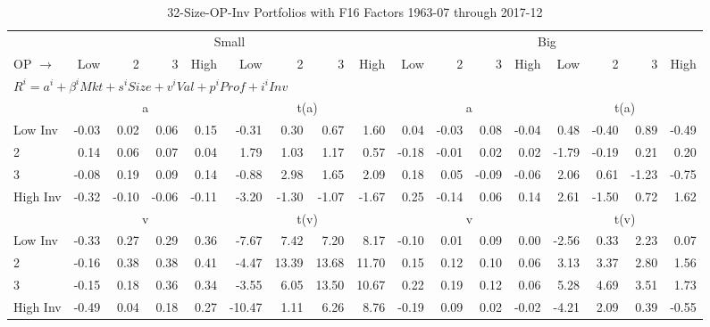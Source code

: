 
\begin{table}[!ht]
\footnotesize
\centering
\caption{32-Size-OP-Inv Portfolios with F16 Factors 1963-07 through 2017-12}
\begin{tabular}{lrrrrrrrrrrrrrrrr}
  \toprule
    & \multicolumn{8}{c}{Small} & \multicolumn{8}{c}{Big} \\
      \cmidrule(r){2-9} \cmidrule(r){10-17}
    OP $\rightarrow$ & Low & 2 & 3 & High & Low & 2 & 3 & High & Low & 2 & 3 & High & Low & 2 & 3 & High \\ 
  \midrule
  \multicolumn{17}{l}{$R^i=a^i+\beta^iMkt+s^iSize+v^iVal+p^iProf+i^iInv$} \\

  
    
      & \multicolumn{4}{c}{a} & \multicolumn{4}{c}{t(a)}
    
      & \multicolumn{4}{c}{a} & \multicolumn{4}{c}{t(a)}
    
    \\
      \cmidrule(r){2-5} \cmidrule(r){6-9} \cmidrule(r){10-13} \cmidrule(r){14-17}

    Low Inv   & -0.03  & 0.02  & 0.06  & 0.15  & -0.31  & 0.30  & 0.67  & 1.60  & 0.04  & -0.03  & 0.08  & -0.04  & 0.48  & -0.40  & 0.89  & -0.49  \\
           2  & 0.14  & 0.06  & 0.07  & 0.04  & 1.79  & 1.03  & 1.17  & 0.57  & -0.18  & -0.01  & 0.02  & 0.02  & -1.79  & -0.19  & 0.21  & 0.20  \\
           3  & -0.08  & 0.19  & 0.09  & 0.14  & -0.88  & 2.98  & 1.65  & 2.09  & 0.18  & 0.05  & -0.09  & -0.06  & 2.06  & 0.61  & -1.23  & -0.75  \\
    High Inv  & -0.32  & -0.10  & -0.06  & -0.11  & -3.20  & -1.30  & -1.07  & -1.67  & 0.25  & -0.14  & 0.06  & 0.14  & 2.61  & -1.50  & 0.72  & 1.62  \\

  
    
      & \multicolumn{4}{c}{v} & \multicolumn{4}{c}{t(v)}
    
      & \multicolumn{4}{c}{v} & \multicolumn{4}{c}{t(v)}
    
    \\
      \cmidrule(r){2-5} \cmidrule(r){6-9} \cmidrule(r){10-13} \cmidrule(r){14-17}

    Low Inv   & -0.33  & 0.27  & 0.29  & 0.36  & -7.67  & 7.42  & 7.20  & 8.17  & -0.10  & 0.01  & 0.09  & 0.00  & -2.56  & 0.33  & 2.23  & 0.07  \\
           2  & -0.16  & 0.38  & 0.38  & 0.41  & -4.47  & 13.39  & 13.68  & 11.70  & 0.15  & 0.12  & 0.10  & 0.06  & 3.13  & 3.37  & 2.80  & 1.56  \\
           3  & -0.15  & 0.18  & 0.36  & 0.34  & -3.55  & 6.05  & 13.50  & 10.67  & 0.22  & 0.19  & 0.12  & 0.06  & 5.28  & 4.69  & 3.51  & 1.73  \\
    High Inv  & -0.49  & 0.04  & 0.18  & 0.27  & -10.47  & 1.11  & 6.26  & 8.76  & -0.19  & 0.09  & 0.02  & -0.02  & -4.21  & 2.09  & 0.39  & -0.55  \\


\end{tabular}
\end{table}
